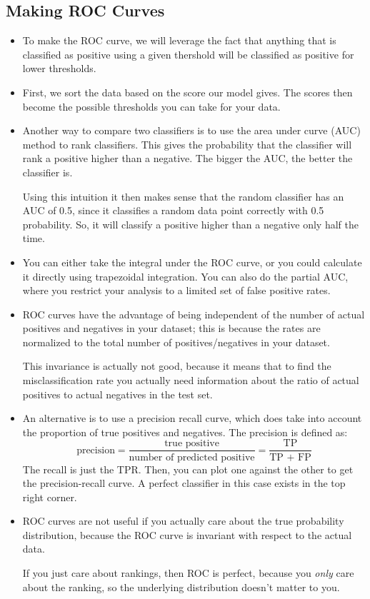 \subsection{Making ROC Curves}
\begin{itemize}
	\item To make the ROC curve, we will leverage the fact that anything that is
		classified as positive using a given thershold will be classified as positive
		for lower thresholds. 
	\item First, we sort the data based on the score our model gives. The scores then
		become the possible thresholds you can take for your data. 
	\item Another way to compare two classifiers is to use the area under curve (AUC)
		method to rank classifiers. This gives the probability that the classifier
		will rank a positive higher than a negative. The bigger the AUC,
		the better the classifier is. 

		Using this intuition it then makes sense that the random classifier has an
		AUC of 0.5, since it classifies a random data point correctly with 0.5
		probability. So, it will classify a positive higher than a negative only half
		the time. 
	\item You can either take the integral under the ROC curve, or you could
		calculate it directly using trapezoidal integration. You can also do the
		partial AUC, where you restrict your analysis to a limited set of false
		positive rates.  
	\item ROC curves have the advantage of being independent of the number of actual
		positives and negatives in your dataset; this is because the rates are
		normalized to the total number of positives/negatives in your dataset.   

		This invariance is actually not good, because it means that to find the
		misclassification rate you actually need information about the ratio of
		actual positives to actual negatives in the test set. 
	\item An alternative is to use a precision recall curve, which does take into
		account the proportion of true positives and negatives. The precision is
		defined as:
		\[
			\text{precision} = \frac{\text{true positive}}{\text{number of predicted
			positive}} = \frac{\text{TP}}{\text{TP + FP}}
		\]
		The recall is just the TPR. Then, you can plot one against the other to get
		the precision-recall curve. A perfect classifier in this case exists in the
		top right corner.   
	\item ROC curves are not useful if you actually care about the true probability
		distribution, because the ROC curve is invariant with respect to the actual
		data.

		If you just care about rankings, then ROC is perfect, because you
		\textit{only} care about the ranking, so the underlying distribution doesn't
		matter to you.
\end{itemize}

